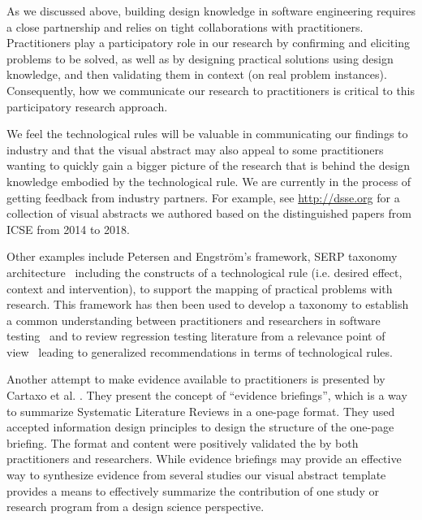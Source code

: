 \documentclass[graybox]{svmult}
\begin{document}
As we discussed above, building design knowledge in software engineering requires a close partnership and relies on tight collaborations with practitioners. 
Practitioners play a participatory role in our research by confirming and eliciting problems to be solved, as well as by designing practical solutions using design knowledge, and then validating them in context (on real problem instances). 
Consequently, how we communicate our research to practitioners is critical to this participatory research approach. 

We feel the technological rules will be valuable in communicating our findings to industry and that the visual abstract may also appeal to some practitioners wanting to quickly gain a bigger picture of the research that is behind the design knowledge embodied by the technological rule. 
We are currently in the process of getting feedback from industry partners.  For example, see \url{http://dsse.org} for a collection of visual abstracts we authored based on the distinguished papers from ICSE from 2014 to 2018.  

Other examples include Petersen and Engstr\"om's framework, SERP taxonomy architecture~\cite{petersen_finding_2014} including the constructs of a technological rule  
(i.e. desired effect, context and intervention), to support the mapping of practical problems with research. 
This framework has then been used to develop a taxonomy to establish a common understanding between practitioners and researchers in software testing~\cite{engstrom_SERP-test_2017} and to review regression testing literature from a relevance point of view~\cite{ali_search_2019} leading to generalized recommendations in terms of technological rules. 

Another attempt to make evidence available to practitioners is presented by Cartaxo et al. \cite{Cartaxo2016}. 
They present the concept of ``evidence briefings'', which is a way to summarize Systematic Literature Reviews in a one-page format. 
They used accepted information design principles to design the structure of the one-page briefing. The format and content were positively validated the by both practitioners and researchers. While evidence briefings may provide an effective way to synthesize evidence from several studies our visual abstract template provides a means to effectively summarize the contribution of one study or research program from a design science perspective.

\end{document}
